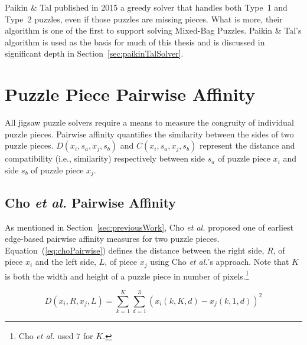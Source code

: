 \documentclass{report}
\def\eref#1{(\ref{#1})}
\begin{document}
Paikin \& Tal \cite{paikin2015} published in 2015 a greedy solver that handles both Type~1 and Type~2 puzzles, even if those puzzles are missing pieces.  What is more, their algorithm is one of the first to support solving Mixed-Bag Puzzles. Paikin \& Tal's algorithm is used as the basis for much of this thesis and is discussed in significant depth in Section~\ref{sec:paikinTalSolver}.















\pagebreak
\section{Puzzle Piece Pairwise Affinity}\label{sec:piecePairwiseAffinity}

All jigsaw puzzle solvers require a means to measure the congruity of individual puzzle pieces.  Pairwise affinity quantifies the similarity between the sides of two puzzle pieces.  $D(x_i, s_a, x_j, s_b)$ and $C(x_i, s_a, x_j, s_b)$ represent the distance and compatibility (i.e., similarity) respectively between side $s_a$ of puzzle piece $x_i$ and side $s_b$ of puzzle piece $x_j$.  

\subsection{Cho \textit{et al.} Pairwise Affinity}\label{sec:choPairwiseAffinity}

As mentioned in Section~\ref{sec:previousWork}, Cho \textit{et al.} \cite{cho2010} proposed one of earliest edge-based pairwise affinity measures for two puzzle pieces.  Equation~\eref{eq:choPairwise} defines the distance between the right side, $R$, of piece $x_i$ and the left side, $L$, of piece $x_j$ using Cho \textit{et al.}'s approach.  Note that $K$ is both the width and height of a puzzle piece in number of pixels.\footnote{Cho \textit{et al.} used 7 for $K$.}

\begin{equation} \label{eq:choPairwise}
D(x_i,R,x_j,L) = \sum_{k=1}^{K}\sum_{d=1}^{3}(x_i(k,K,d) - x_j(k,1,d))^2
\end{equation}
\end{document}
